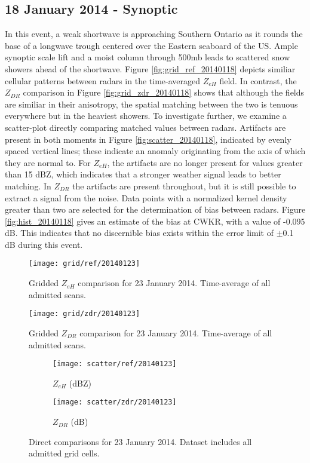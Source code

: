 \subsection{18 January 2014 - Synoptic}
In this event, a weak shortwave is approaching Southern Ontario as it rounds the base of a longwave trough centered over the Eastern seaboard of the US. 
Ample synoptic scale lift and a moist column through 500mb leads to scattered snow showers ahead of the shortwave. Figure \ref{fig:grid_ref_20140118} depicts
similiar cellular patterns between radars in the time-averaged $Z_{eH}$ field. In contrast, the $Z_{DR}$ comparison in Figure \ref{fig:grid_zdr_20140118}
shows that although the fields are similiar in their anisotropy, the spatial matching between the two is tenuous everywhere but in the heaviest showers. To
investigate further, we examine a scatter-plot directly comparing matched values between radars. Artifacts are present in both moments in Figure
\ref{fig:scatter_20140118}, indicated by evenly spaced vertical lines; these indicate an anomaly originating from the axis of which they are normal to. For
$Z_{eH}$, the artifacts are no longer present for values greater than 15 dBZ, which indicates that a stronger weather signal leads to better matching. In $Z_{DR}$ the artifacts are present throughout, but it is still possible to extract a signal from the noise. Data points with a normalized kernel density
greater than two are selected for the determination of bias between radars. Figure \ref{fig:hist_20140118} gives an estimate of the bias at CWKR, with a
value of -0.095 dB. This indicates that no discernible bias exists within the
error limit of $\pm$0.1 dB  during this event.


\begin{figure}[p]
\texttt{[image: grid/ref/20140123]}
\caption{Gridded $Z_{eH}$ comparison for 23 January 2014. Time-average of all admitted scans.} 
\label{fig:grid_ref_20140123}
\end{figure}

\begin{figure}[p]
\texttt{[image: grid/zdr/20140123]}
\caption{Gridded $Z_{DR}$ comparison for 23 January 2014. Time-average of all admitted scans.} 
\label{fig:grid_zdr_20140123}
\end{figure}

\begin{figure}[p]
\centering
   \begin{subfigure}{0.49\linewidth} \centering
     \texttt{[image: scatter/ref/20140123]}
     \caption{$Z_{eH}$ (dBZ)}\label{fig:scatter_ref_20140123}
   \end{subfigure}
   \begin{subfigure}{0.49\linewidth} \centering
     \texttt{[image: scatter/zdr/20140123]}
     \caption{$Z_{DR}$ (dB)}\label{fig:scatter_zdr_20140123}
   \end{subfigure}
\caption{Direct comparisons for 23 January 2014. Dataset includes all admitted grid cells.} \label{fig:scatter_20140123}
\end{figure}

